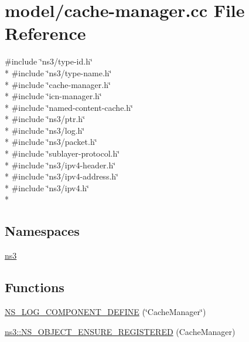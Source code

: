 \hypertarget{cache-manager_8cc}{\section{model/cache-\/manager.cc File Reference}
\label{cache-manager_8cc}
}
{\ttfamily \#include \char`\"{}ns3/type-\/id.\-h\char`\"{}}\\*
{\ttfamily \#include \char`\"{}ns3/type-\/name.\-h\char`\"{}}\\*
{\ttfamily \#include \char`\"{}cache-\/manager.\-h\char`\"{}}\\*
{\ttfamily \#include \char`\"{}icn-\/manager.\-h\char`\"{}}\\*
{\ttfamily \#include \char`\"{}named-\/content-\/cache.\-h\char`\"{}}\\*
{\ttfamily \#include \char`\"{}ns3/ptr.\-h\char`\"{}}\\*
{\ttfamily \#include \char`\"{}ns3/log.\-h\char`\"{}}\\*
{\ttfamily \#include \char`\"{}ns3/packet.\-h\char`\"{}}\\*
{\ttfamily \#include \char`\"{}sublayer-\/protocol.\-h\char`\"{}}\\*
{\ttfamily \#include \char`\"{}ns3/ipv4-\/header.\-h\char`\"{}}\\*
{\ttfamily \#include \char`\"{}ns3/ipv4-\/address.\-h\char`\"{}}\\*
{\ttfamily \#include \char`\"{}ns3/ipv4.\-h\char`\"{}}\\*
\subsection*{Namespaces}
\begin{DoxyCompactItemize}
\item 
\hyperlink{namespacens3}{ns3}
\end{DoxyCompactItemize}
\subsection*{Functions}
\begin{DoxyCompactItemize}
\item 
\hyperlink{cache-manager_8cc_a6ce37ef34f486407a4820d76f400d96f}{N\-S\-\_\-\-L\-O\-G\-\_\-\-C\-O\-M\-P\-O\-N\-E\-N\-T\-\_\-\-D\-E\-F\-I\-N\-E} (\char`\"{}Cache\-Manager\char`\"{})
\item 
\hyperlink{namespacens3_a8da84469566489f34d19639bac5068a9}{ns3\-::\-N\-S\-\_\-\-O\-B\-J\-E\-C\-T\-\_\-\-E\-N\-S\-U\-R\-E\-\_\-\-R\-E\-G\-I\-S\-T\-E\-R\-E\-D} (Cache\-Manager)
\end{DoxyCompactItemize}


